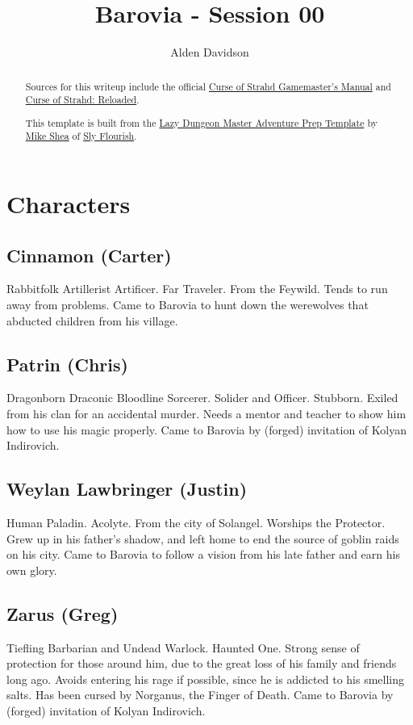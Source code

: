 \documentclass[a4paper,11pt]{article}
\title{Barovia - Session 00}
\author{Alden Davidson}
\begin{document}
\maketitle
\tableofcontents

\begin{abstract}
  Sources for this writeup include the official
  \href{https://5e.tools/adventure.html#cos}{Curse of Strahd Gamemaster's Manual} and
  \href{https://www.reddit.com/r/CurseofStrahd/comments/9bpzbh/curse_of_strahd_reloaded_compilation_thread/}{Curse of Strahd: Reloaded}.
  
  This template is built from the
  \href{https://slyflourish.com/rotldm_template.html}{Lazy Dungeon Master Adventure Prep Template} by
  \href{https://slyflourish.com/about_mike_shea.html}{Mike Shea} of \href{https://slyflourish.com/}{Sly Flourish}.
\end{abstract}

\pagebreak
\section{Characters}
\label{sec:Characters}
\subsection{Cinnamon (Carter)}
  Rabbitfolk Artillerist Artificer. Far Traveler. From the Feywild. Tends to run away from problems. Came to
  Barovia to hunt down the werewolves that abducted children from his village.
\subsection{Patrin (Chris)}
  Dragonborn Draconic Bloodline Sorcerer. Solider and Officer. Stubborn. Exiled from his clan for an accidental 
  murder. Needs a mentor and teacher to show him how to use his magic properly. Came to Barovia by (forged)
  invitation of Kolyan Indirovich.
\subsection{Weylan Lawbringer (Justin)}
  Human Paladin. Acolyte. From the city of Solangel. Worships the Protector. Grew up in his father's shadow, and 
  left home to end the source of goblin raids on his city. Came to Barovia to follow a vision from his late 
  father and earn his own glory.
\subsection{Zarus (Greg)}
  Tiefling Barbarian and Undead Warlock. Haunted One. Strong sense of protection for those around him, due to the
  great loss of his family and friends long ago. Avoids entering his rage if possible, since he is addicted to 
  his smelling salts. Has been cursed by Norganus, the Finger of Death. Came to Barovia by (forged) invitation 
  of Kolyan Indirovich.
\end{document}
